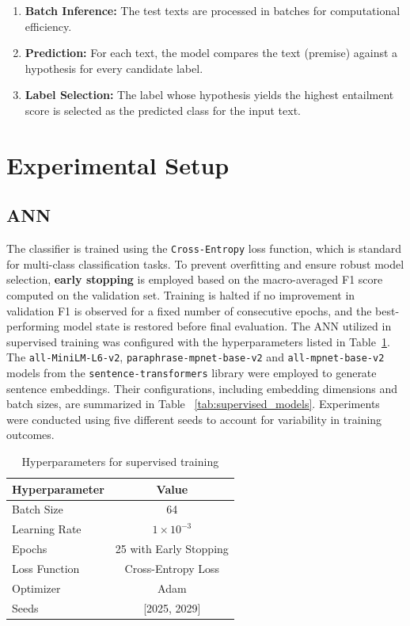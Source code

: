 \documentclass[runningheads]{llncs}
\begin{document}
\begin{enumerate}
    \item \textbf{Batch Inference:} The test texts are processed in batches for computational efficiency.
    \item \textbf{Prediction:} For each text, the model compares the text (premise) against a hypothesis for every candidate label.
    \item \textbf{Label Selection:} The label whose hypothesis yields the highest entailment score is selected as the predicted class for the input text.
\end{enumerate}

\vspace{-1.6em}
\section{Experimental Setup}
\subsection{ANN}

The classifier is trained using the \texttt{Cross-Entropy} loss function, which is standard for multi-class classification tasks. 
To prevent overfitting and ensure robust model selection, \textbf{early stopping} is employed based on the macro-averaged F1 score computed on the validation set. Training is halted if no improvement in validation F1 is observed for a fixed number of consecutive epochs, and the best-performing model state is restored before final evaluation. The ANN utilized in supervised training was configured with the hyperparameters listed in Table~\ref{tab:supervised_hyperparams}. The \texttt{all-MiniLM-L6-v2}, \texttt{paraphrase-mpnet-base-v2} and \texttt{all-mpnet-base-v2} models from the \texttt{sentence-transformers} library were employed to generate sentence embeddings. Their configurations, including embedding dimensions and batch sizes, are summarized in Table ~\ref{tab:supervised_models}. Experiments were conducted using five different seeds to account for variability in training outcomes.

\vspace{-2em}

\begin{table}[H]
\centering
\caption{Hyperparameters for supervised training}
\label{tab:supervised_hyperparams}
\begin{tabular}{lc}
\hline
\textbf{Hyperparameter} & \textbf{Value} \\
\hline
Batch Size & 64 \\
Learning Rate & $1 \times 10^{-3}$ \\
Epochs & 25 with Early Stopping \\
Loss Function & Cross-Entropy Loss \\
Optimizer & Adam \\
Seeds & [2025, 2029] \\
\hline
\end{tabular}
\end{table}
\end{document}
